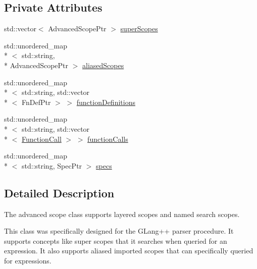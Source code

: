 \subsection*{Private Attributes}
\begin{DoxyCompactItemize}
\item 
std\-::vector$<$ Advanced\-Scope\-Ptr $>$ \hyperlink{classgiskard__suturo_1_1AdvancedScope_ab4a2ea0c6a7d6401c7e5b2795a3094bb}{super\-Scopes}
\item 
std\-::unordered\-\_\-map\\*
$<$ std\-::string, \\*
Advanced\-Scope\-Ptr $>$ \hyperlink{classgiskard__suturo_1_1AdvancedScope_a9a27c5f444714caf79ec05ac606c84a5}{aliased\-Scopes}
\item 
std\-::unordered\-\_\-map\\*
$<$ std\-::string, std\-::vector\\*
$<$ Fn\-Def\-Ptr $>$ $>$ \hyperlink{classgiskard__suturo_1_1AdvancedScope_a32385ec7d5bdd31f190473293e3445f8}{function\-Definitions}
\item 
std\-::unordered\-\_\-map\\*
$<$ std\-::string, std\-::vector\\*
$<$ \hyperlink{structgiskard__suturo_1_1FunctionCall}{Function\-Call} $>$ $>$ \hyperlink{classgiskard__suturo_1_1AdvancedScope_a6208063287509649126390c5960abfb8}{function\-Calls}
\item 
std\-::unordered\-\_\-map\\*
$<$ std\-::string, Spec\-Ptr $>$ \hyperlink{classgiskard__suturo_1_1AdvancedScope_a92bbb9dc2613a1331a95f7e0310dd342}{specs}
\end{DoxyCompactItemize}


\subsection{Detailed Description}
The advanced scope class supports layered scopes and named search scopes. 

This class was specifically designed for the G\-Lang++ parser procedure. It supports concepts like super scopes that it searches when queried for an expression. It also supports aliased imported scopes that can specifically queried for expressions. 


